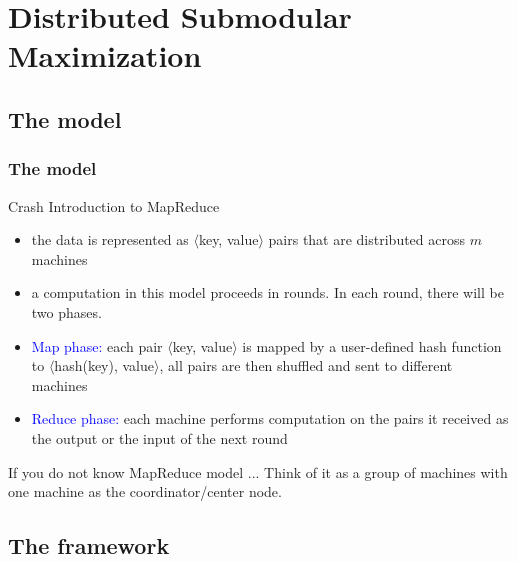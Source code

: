 \documentclass{beamer}
\newcommand{\emRed}[1][]{\textcolor{blue} #1}
\begin{document}


\section{Distributed Submodular Maximization}
\subsection{The model}
\begin{frame}
  \frametitle{The model}
  \begin{block}{Crash Introduction to MapReduce}
  
  \begin{itemize}
  \item the data is represented as $\langle$key, value$\rangle$ pairs that are distributed across $m$ machines
    \item a computation in this model proceeds in rounds. In each round, there will be two phases.
      \item \emRed{Map phase:} each pair $\langle$key, value$\rangle$ is mapped by a user-defined hash function to $\langle$hash(key), value$\rangle$, all pairs are then shuffled and sent to different machines
      \item \emRed{Reduce phase:} each machine performs computation on the pairs it received as the output or the input of the next round
  \end{itemize}
  \end{block}
  \pause
  \begin{block}{If you do not know MapReduce model ...}
    Think of it as a group of machines with one machine as the coordinator/center node.    
  \end{block}
\end{frame}

\subsection{The framework}
\end{document}
